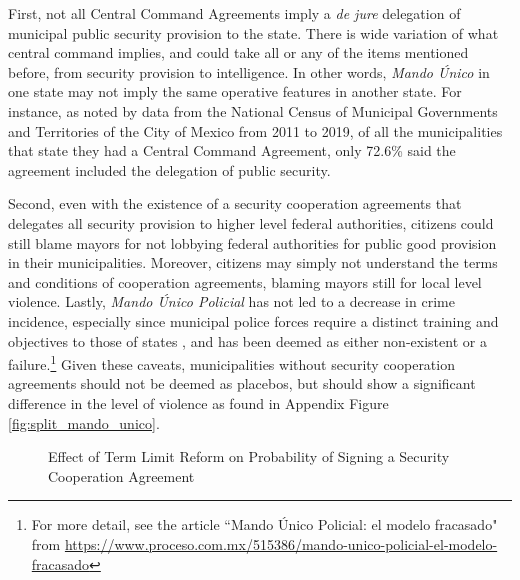 \documentclass[12pt]{amsart}
\numberwithin{equation}{section}
\theoremstyle{definition}
\theoremstyle{definition}
\theoremstyle{definition}
\begin{document}
\begin{appendix}
First, not all Central Command Agreements imply a \emph{de jure} delegation of municipal public security provision to the state. There is wide variation of what central command implies, and could take all or any of the items mentioned before, from security provision to intelligence. In other words, \emph{Mando \'Unico} in one state may not imply the same operative features in another state.  %
For instance, as noted by data from the National Census of Municipal Governments and Territories of the City of Mexico from 2011 to 2019, of all the municipalities that state they had a Central Command Agreement, only 72.6\% said the agreement included the delegation of public security.

Second, even with the existence of a security cooperation agreements that delegates all security provision to higher level federal authorities, citizens could still blame mayors for not lobbying federal authorities for public good provision in their municipalities. Moreover, citizens may simply not understand the terms and conditions of cooperation agreements, blaming mayors still for local level violence. Lastly, \emph{Mando \'Unico Policial} has not led to a decrease in crime incidence, especially since municipal police forces require a distinct training and objectives to those of states \citep{david_lopez_2018}, and has been deemed as either non-existent or a failure.\footnote{For more detail, see the article ``Mando \'Unico Policial: el modelo fracasado" from \url{https://www.proceso.com.mx/515386/mando-unico-policial-el-modelo-fracasado}} Given these caveats, municipalities without security cooperation agreements should not be deemed as placebos, but should show a significant difference in the level of violence as found in Appendix Figure \ref{fig:split_mando_unico}. 
 
 
  \begin{figure}[H]
\centering
\caption{Effect of Term Limit Reform on Probability of Signing a Security Cooperation Agreement}
  \label{fig:mando_unico}


\end{figure}
\end{appendix}
\end{document}
